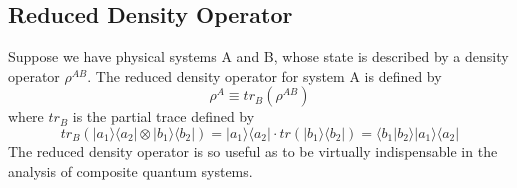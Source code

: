 \subsection{Reduced Density Operator}
Suppose we have physical systems A and B, whose state is described by a density operator $\rho^{AB}$. The reduced density operator for system A is defined by
\begin{equation}
\rho^A \equiv tr_B(\rho^{AB})
\end{equation}
where $tr_B$ is the partial trace defined by
\begin{equation}
tr_B(| a_1 \rangle \langle a_2 | \otimes | b_1 \rangle \langle b_2 |) = | a_1 \rangle \langle a_2 |\cdot tr(| b_1 \rangle \langle b_2 |) = \langle b_1 | b_2 \rangle| a_1 \rangle \langle a_2 | 
\end{equation}
The reduced density operator is so useful as to be virtually indispensable in the analysis of composite quantum systems. \\
